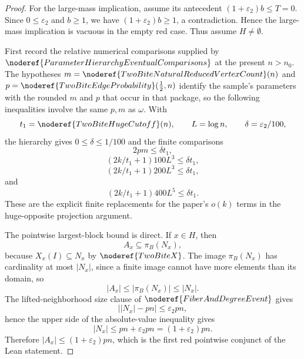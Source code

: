 \begin{proof}
For the large-mass implication, assume its antecedent
\((1+\varepsilon_2)b\le T=0\).  Since \(0\le\varepsilon_2\) and \(b\ge1\),
we have \((1+\varepsilon_2)b\ge1\), a contradiction.  Hence the large-mass
implication is vacuous in the empty red case.
Thus assume \(H\ne\emptyset\).

First record the relative numerical comparisons supplied by
\(\noderef{ParameterHierarchyEventualComparisons}\) at the present \(n>n_0\).
The hypotheses \(m=\noderef{TwoBiteNaturalReducedVertexCount}(n)\) and
\(p=\noderef{TwoBiteEdgeProbability}(\frac12,n)\) identify the sample's
parameters with the rounded \(m\) and \(p\) that occur in that package, so the
following inequalities involve the same \(p,m\) as \(\omega\).
With
\[
t_1=\noderef{TwoBiteHugeCutoff}(n),\qquad L=\log n,
\qquad \delta=\varepsilon_2/100,
\]
the hierarchy gives \(0\le\delta\le1/100\) and the finite comparisons
\[
2pm\le\delta t_1, \tag{1}
\]
\[
\left(2k/t_1+1\right)100L^3\le\delta t_1, \tag{2}
\]
\[
\left(2k/t_1+1\right)200L^3\le\delta t_1, \tag{3}
\]
and
\[
\left(2k/t_1+1\right)400L^5\le\delta t_1. \tag{4}
\]
These are the explicit finite replacements for the paper's \(o(k)\) terms in
the huge-opposite projection argument.

The pointwise largest-block bound is direct.  If \(x\in H\), then
\[
A_x\subseteq \pi_B(N_x),
\]
because \(X_x(I)\subseteq N_x\) by \(\noderef{TwoBiteX}\).  The image
\(\pi_B(N_x)\) has cardinality at most \(|N_x|\), since a finite image cannot
have more elements than its domain, so
\[
|A_x|\le |\pi_B(N_x)|\le |N_x|.
\]
The lifted-neighborhood size clause of \(\noderef{FiberAndDegreeEvent}\) gives
\[
\bigl||N_x|-pn\bigr|\le\varepsilon_2pn,
\]
hence the upper side of the absolute-value inequality gives
\[
|N_x|\le pn+\varepsilon_2pn=(1+\varepsilon_2)pn.
\]
Therefore \(|A_x|\le(1+\varepsilon_2)pn\), which is the first red pointwise
conjunct of the Lean statement.


\end{proof}
